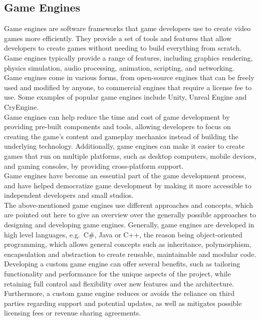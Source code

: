 \subsection{Game Engines}\label{subsec:game-engines}
Game engines are software frameworks that game developers use to create video games more efficiently.
They provide a set of tools and features that allow developers to create games without needing to build everything from scratch.
Game engines typically provide a range of features, including graphics rendering, physics simulation, audio processing, animation, scripting, and networking.
\\
Game engines come in various forms, from open-source engines that can be freely used and modified by anyone, to commercial engines that require a license fee to use.
Some examples of popular game engines include Unity, Unreal Engine and CryEngine.
\\
Game engines can help reduce the time and cost of game development by providing pre-built components and tools, allowing developers to focus on creating the game's content and gameplay mechanics instead of building the underlying technology.
Additionally, game engines can make it easier to create games that run on multiple platforms, such as desktop computers, mobile devices, and gaming consoles, by providing cross-platform support.
\\
Game engines have become an essential part of the game development process, and have helped democratize game development by making it more accessible to independent developers and small studios.
\\
The above-mentioned game engines use different approaches and concepts, which are pointed out here to give an overview over the generally possible approaches to
designing and developing game engines.
Generally, game engines are developed in high level languages, e.g.~C\#, Java or C++, the reason being object-oriented programming,
which allows general concepts such as inheritance, polymorphism, encapsulation and abstraction to create reusable, maintainable and modular code.
\\
Developing a custom game engine can offer several benefits, such as tailoring functionality and performance for the unique aspects of the project, while
retaining full control and flexibility over new features and the architecture.
Furthermore, a custom game engine reduces or avoids the reliance on third parties regarding support and potential updates, as well as mitigates possible
licensing fees or revenue sharing agreements.

